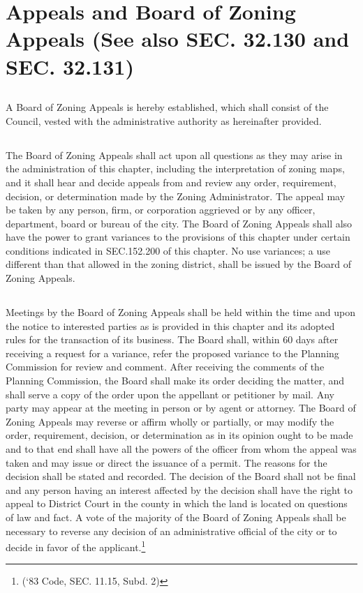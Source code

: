 \section{Appeals and Board of Zoning Appeals (See also SEC. 32.130 and SEC. 32.131)}
\subsection{}
A Board of Zoning Appeals is hereby established, which shall consist of the Council, vested with the administrative authority as hereinafter provided.
\subsection{}
The Board of Zoning Appeals shall act upon all questions as they may arise in the administration of this chapter, including the interpretation of zoning maps, and it shall hear and decide appeals from and review any order, requirement, decision, or determination made by the Zoning Administrator. The appeal may be taken by any person, firm, or corporation aggrieved or by any officer, department, board or bureau of the city. The Board of Zoning Appeals shall also have the power to grant variances to the provisions of this chapter under certain conditions indicated in SEC.152.200 of this chapter. No use variances; a use different than that allowed in the zoning district, shall be issued by the Board of Zoning Appeals.
\subsection{}
Meetings by the Board of Zoning Appeals shall be held within the time and upon the notice to interested parties as is provided in this chapter and its adopted rules for the transaction of its business. The Board shall, within 60 days after receiving a request for a variance, refer the proposed variance to the Planning Commission for review and comment. After receiving the comments of the Planning Commission, the Board shall make its order deciding the matter, and shall serve a copy of the order upon the appellant or petitioner by mail. Any party may appear at the meeting in person or by agent or attorney. The Board of Zoning Appeals may reverse or affirm wholly or partially, or may modify the order, requirement, decision, or determination as in its opinion ought to be made and to that end shall have all the powers of the officer from whom the appeal was taken and may issue or direct the issuance of a permit. The reasons for the decision shall be stated and recorded.  The decision of the Board shall not be final and any person having an interest affected by the decision shall have the right to appeal to District Court in the county in which the land is located on questions of law and fact. A vote of the majority of the Board of Zoning Appeals shall be necessary to reverse any decision of an administrative official of the city or to decide in favor of the applicant.\footnote{(‘83 Code, SEC. 11.15, Subd. 2)}

